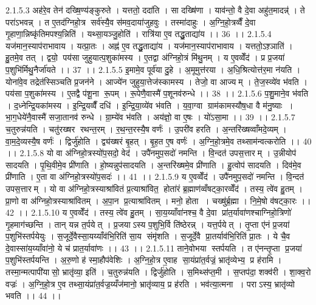 2.1.5.3
अह॑रे॒व तेन॑ दख्षि॒ण्य॑ङ्कुरुते । यत्ततो॒ ददा॑ति । सा दख्षि॑णा । याव॑न्तो॒ वै दे॒वा अहु॑त॒मादन्न्॑ । ते परा॑ऽभवन्न् । त ए॒तद॑ग्निहो॒त्र सर्व॑स्यै॒व स॑मव॒दाया॑जुहवुः । तस्मा॑दाहुः । अ॒ग्नि॒हो॒त्रव्वैँ दे॒वा गृ॒हाणा॒न्निष्कृ॑तिमपश्य॒न्निति॑ । यथ्सा॒यञ्जु॒होति॑ । रात्रि॑या ए॒व तद्धु॒ताद्या॑य ।। 36 ।।
2.1.5.4
यज॑मान॒स्याप॑राभावाय । यत्प्रा॒तः । अह्न॑ ए॒व तद्धु॒ताद्या॑य । यज॑मान॒स्याप॑राभावाय । यत्ततो॒ऽश़्ञाति॑ । हु॒तमे॒व तत् । द्वयो॒ पय॑सा जुहुयात्प॒शुका॑मस्य । ए॒तद्वा अ॑ग्निहो॒त्रं मि॑थु॒नम् । य ए॒वव्वेँद॑ । प्र प्र॒जया॑ प॒शुभि॑र्मिथु॒नैर्जा॑यते ।। 37 ।।
2.1.5.5
इ॒मामे॒व पूर्व॑या दु॒हे । अ॒मूमुत्त॑रया । अ॒धि॒श्रित्योत्त॑र॒मा न॑यति । योना॑वे॒व तद्रेत॑स्सिञ्चति प्र॒जन॑ने । आज्ये॑न जुहुया॒त्तेज॑स्कामस्य । तेजो॒ वा आज्यम् । ते॒ज॒स्व्ये॑व भ॑वति । पय॑सा प॒शुका॑मस्य । ए॒तद्वै प॑शू॒ना रू॒पम् । रू॒पेणै॒वास्मै॑ प॒शूनव॑रुन्धे ।। 38 ।।
2.1.5.6
प॒शु॒माने॒व भ॑वति । द॒ध्नेन्द्रि॒यका॑मस्य । इ॒न्द्रि॒यव्वैँ दधि॑ । इ॒न्द्रि॒या॒व्ये॑व भ॑वति । य॒वा॒ग्वा ग्राम॑कामस्यौष॒धा वै म॑नु॒ष्याः । भा॒ग॒धेये॑नै॒वास्मै॑ सजा॒तानव॑ रुन्धे । ग्रा॒म्ये॑व भ॑वति । अय॑ज्ञो॒ वा ए॒षः । यो॑ऽसा॒मा ।। 39 ।।
2.1.5.7
च॒तुरुन्न॑यति । चतु॑रख्षर रथन्त॒रम् । र॒थ॒न्त॒रस्यै॒ष वर्णः॑ । उ॒परी॑व हरति । अ॒न्तरि॑ख्षव्वाँमदे॒व्यम् । वा॒म॒दे॒व्यस्यै॒ष वर्णः॑ । द्विर्जु॑होति । द्व्य॑ख्षरं बृ॒हत् । बृ॒ह॒त ए॒ष वर्णः॑ । अ॒ग्नि॒हो॒त्रमे॒व तथ्साम॑न्वत्करोति ।। 40 ।।
2.1.5.8
यो वा अ॑ग्निहो॒त्रस्यो॑प॒सदो॒ वेद॑ । उपै॑नमुप॒सदो॑ नमन्ति । वि॒न्दत॑ उपस॒त्तारम् । उ॒न्नीयोप॑ सादयति । पृ॒थि॒वीमे॒व प्री॑णाति । हो॒ष्यन्नुप॑सादयति । अ॒न्तरि॑ख्षमे॒व प्री॑णाति । हु॒त्वोप॑ सादयति । दिव॑मे॒व प्री॑णाति । ए॒ता वा अ॑ग्निहो॒त्रस्यो॑प॒सदः॑ ।। 41 ।।
2.1.5.9
य ए॒वव्वेँद॑ । उपै॑नमुप॒सदो॑ नमन्ति । वि॒न्दत॑ उपस॒त्तारम् । यो वा अ॑ग्निहो॒त्रस्याश्रा॑वितं प्र॒त्याश्रा॑वित॒॒ होता॑रं ब्र॒ह्माण॑व्वँषट्का॒रव्वेँद॑ । तस्य॒ त्वे॑व हु॒तम् । प्रा॒णो वा अ॑ग्निहो॒त्रस्याश्रा॑वितम् । अ॒पा॒न प्र॒त्याश्रा॑वितम् । मनो॒ होता । चख्षु॑र्ब्र॒ह्मा । नि॒मे॒षो व॑षट्का॒रः ।। 42 ।।
2.1.5.10
य ए॒वव्वेँद॑ । तस्य॒ त्वे॑व हु॒तम् । सा॒य॒य्याँवा॑नश्च॒ वै दे॒वा प्रा॑त॒र्यावा॑णश्चाग्निहो॒त्रिणो॑ गृ॒हमाग॑च्छन्ति । तान् यन्न त॒र्पयेत् । प्र॒जयाऽस्य प॒शुभि॒र्वि ति॑ष्ठेरन्न् । यत्त॒र्पयेत् । तृ॒प्ता ए॑नं प्र॒जया॑ प॒शुभि॑स्तर्पयेयुः । स॒जूर्दे॒वैस्सा॒यय्याँव॑भि॒रिति॑ सा॒य संमृ॑शति । स॒जूर्दे॒वै प्रा॒तर्याव॑भि॒रिति॑ प्रा॒तः । ये चै॒व दे॒वास्सा॑य॒य्याँवा॑नो॒ ये च॑ प्रात॒र्यावा॑णः ।। 43 ।।
2.1.5.11
ताने॒वोभया॑ स्तर्पयति । त ए॑नन्तृ॒प्ता प्र॒जया॑ प॒शुभि॑स्तर्पयन्ति । अ॒रु॒णो ह॑ स्मा॒हौप॑वेशिः । अ॒ग्नि॒हो॒त्र ए॒वाह सा॒यंप्रा॑त॒र्वज्रं॒ भ्रातृ॑व्येभ्य॒ प्र ह॑रामि । तस्मा॒न्मत्पापी॑यासो॒ भ्रातृ॑व्या॒ इति॑ । च॒तुरुन्न॑यति । द्विर्जु॑होति । स॒मिथ्स॑प्त॒मी । स॒प्तप॑दा॒ शक्व॑री । शा॒क्व॒रो वज्रः॑ । अ॒ग्नि॒हो॒त्र ए॒व तथ्सा॒यंप्रा॑त॒र्वज्र॒य्यँज॑मानो॒ भ्रातृ॑व्याय॒ प्र ह॑रति । भव॑त्या॒त्मना । पराऽस्य॒ भ्रातृ॑व्यो भवति ।। 44 ।।
